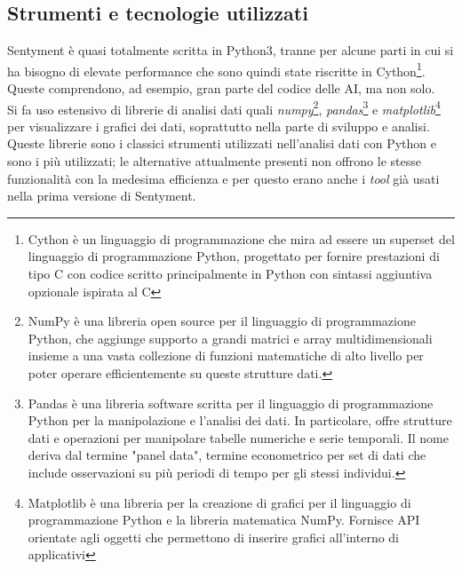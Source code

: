 \documentclass[a4paper,12pt]{report}
\begin{document}
\subsection{Strumenti e tecnologie utilizzati}
Sentyment è quasi totalmente scritta in Python3, tranne per alcune parti in cui si ha bisogno di elevate performance che sono quindi state riscritte in Cython\footnote{Cython è un linguaggio di programmazione che mira ad essere un superset del linguaggio di programmazione Python, progettato per fornire prestazioni di tipo C con codice scritto principalmente in Python con sintassi aggiuntiva opzionale ispirata al C}. Queste comprendono, ad esempio, gran parte del codice delle AI, ma non solo.\\
Si fa uso estensivo di librerie di analisi dati quali \textit{numpy}\footnote{NumPy è una libreria open source per il linguaggio di programmazione Python, che aggiunge supporto a grandi matrici e array multidimensionali insieme a una vasta collezione di funzioni matematiche di alto livello per poter operare efficientemente su queste strutture dati.}, \textit{pandas}\footnote{Pandas è una libreria software scritta per il linguaggio di programmazione Python per la manipolazione e l'analisi dei dati. In particolare, offre strutture dati e operazioni per manipolare tabelle numeriche e serie temporali. Il nome deriva dal termine "panel data", termine econometrico per set di dati che include osservazioni su più periodi di tempo per gli stessi individui.} e \textit{matplotlib}\footnote{Matplotlib è una libreria per la creazione di grafici per il linguaggio di programmazione Python e la libreria matematica NumPy. Fornisce API orientate agli oggetti che permettono di inserire grafici all'interno di applicativi} per visualizzare i grafici dei dati, soprattutto nella parte di sviluppo e analisi.\\
Queste librerie sono i classici strumenti utilizzati nell'analisi dati con Python e sono i più utilizzati; le alternative attualmente presenti non offrono le stesse funzionalità con la medesima efficienza e per questo erano anche i \textit{tool} già usati nella prima versione di Sentyment.\\
\end{document}
